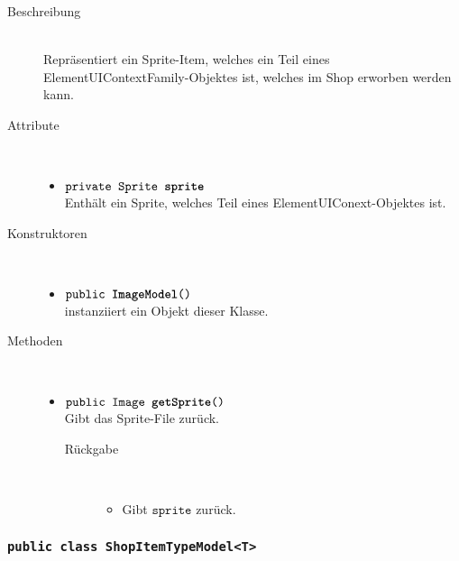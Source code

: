 \begin{description}
\item[Beschreibung] \hfill \\ Repräsentiert ein Sprite-Item, welches ein Teil eines ElementUIContextFamily-Objektes ist, welches im Shop erworben werden kann.

\item[Attribute] \hfill \\
	\vspace{-.8cm}
	\begin{itemize}
		\item $\texttt{private Sprite \textbf{sprite}}$ \\ Enthält ein Sprite, welches Teil eines ElementUIConext-Objektes ist.

		\end{itemize}
	
\item[Konstruktoren] \hfill \\
	\vspace{-.8cm}
	\begin{itemize}
		\item $\texttt{public \textbf{ImageModel}()}$ \\ instanziiert ein Objekt dieser Klasse.

	\end{itemize}
	
\item[Methoden] \hfill \\
	\vspace{-.8cm}
	\begin{itemize}
		\item $\texttt{public Image \textbf{getSprite}()}$ \\ Gibt das Sprite-File zurück.
		\begin{description}
			\item[Rückgabe] \hfill \\
			\vspace{-.8cm}
			\begin{itemize}
				\item Gibt $\texttt{sprite}$ zurück.
			\end{itemize}
			\end{description}
		
	\end{itemize}
\end{description}




\subsubsection{\normalfont \texttt{public class \textbf{ShopItemTypeModel<T>}}}

